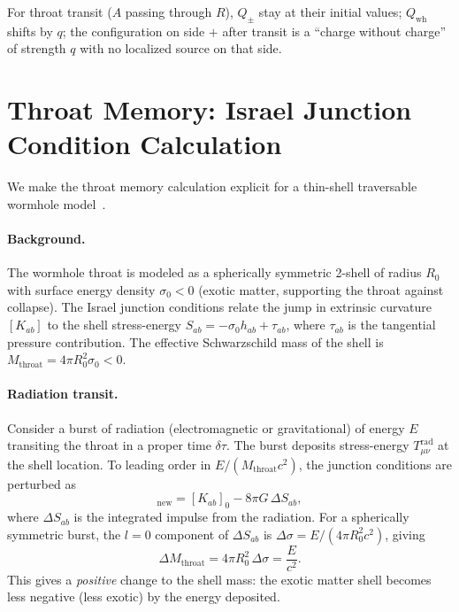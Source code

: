 \documentclass[aps,prd,onecolumn,nofootinbib,superscriptaddress]{revtex4-2}
\begin{document}
For throat transit ($A$ passing through $R$), $Q_\pm$ stay at their initial
values; $Q_{\mathrm{wh}}$ shifts by $q$; the configuration on side $+$ after
transit is a ``charge without charge'' of strength $q$ with no localized
source on that side.

\section{Throat Memory: Israel Junction Condition Calculation}
\label{app:israel}

We make the throat memory calculation explicit for a thin-shell traversable
wormhole model~\cite{Visser1995LorentzianWormholes}.

\paragraph{Background.}
The wormhole throat is modeled as a spherically symmetric 2-shell of radius
$R_0$ with surface energy density $\sigma_0<0$ (exotic matter, supporting the
throat against collapse).  The Israel junction conditions
relate the jump in extrinsic curvature $[K_{ab}]$ to the shell stress-energy
$S_{ab}=-\sigma_0 h_{ab}+\tau_{ab}$, where $\tau_{ab}$ is the tangential
pressure contribution.  The effective Schwarzschild mass of the shell is
$M_{\mathrm{throat}}=4\pi R_0^2 \sigma_0<0$.

\paragraph{Radiation transit.}
Consider a burst of radiation (electromagnetic or gravitational) of energy $E$
transiting the throat in a proper time $\delta\tau$.  The burst deposits
stress-energy $T_{\mu\nu}^{\mathrm{rad}}$ at the shell location.  To leading
order in $E/(M_{\mathrm{throat}}c^2)$, the junction conditions are perturbed as
\begin{equation}
  [K_{ab}]_{\mathrm{new}}
  = [K_{ab}]_0 - 8\pi G\,\Delta S_{ab},
\end{equation}
where $\Delta S_{ab}$ is the integrated impulse from the radiation.  For a
spherically symmetric burst, the $l=0$ component of $\Delta S_{ab}$ is
$\Delta\sigma = E/(4\pi R_0^2 c^2)$, giving
\begin{equation}
  \Delta M_{\mathrm{throat}} = 4\pi R_0^2\,\Delta\sigma = \frac{E}{c^2}.
\end{equation}
This gives a \emph{positive} change to the shell mass: the exotic matter
shell becomes less negative (less exotic) by the energy deposited.
\end{document}
